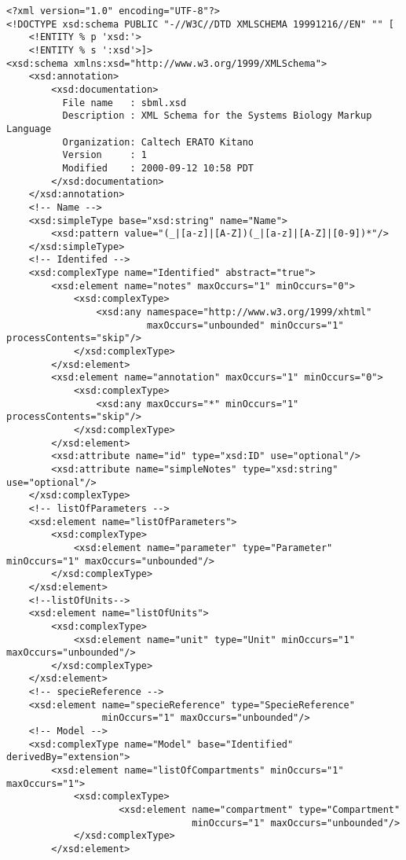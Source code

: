 \documentclass[10pt]{cek-article}
\begin{document}
\begin{small}
\tightspacing
\begin{verbatim}
<?xml version="1.0" encoding="UTF-8"?>
<!DOCTYPE xsd:schema PUBLIC "-//W3C//DTD XMLSCHEMA 19991216//EN" "" [
    <!ENTITY % p 'xsd:'>
    <!ENTITY % s ':xsd'>]>
<xsd:schema xmlns:xsd="http://www.w3.org/1999/XMLSchema">
    <xsd:annotation>
        <xsd:documentation>
          File name   : sbml.xsd
          Description : XML Schema for the Systems Biology Markup Language
          Organization: Caltech ERATO Kitano
          Version     : 1
          Modified    : 2000-09-12 10:58 PDT
        </xsd:documentation>
    </xsd:annotation>
    <!-- Name -->
    <xsd:simpleType base="xsd:string" name="Name">
        <xsd:pattern value="(_|[a-z]|[A-Z])(_|[a-z]|[A-Z]|[0-9])*"/>
    </xsd:simpleType>
    <!-- Identifed -->
    <xsd:complexType name="Identified" abstract="true">
        <xsd:element name="notes" maxOccurs="1" minOccurs="0">
            <xsd:complexType>
                <xsd:any namespace="http://www.w3.org/1999/xhtml"
                         maxOccurs="unbounded" minOccurs="1" processContents="skip"/>
            </xsd:complexType>
        </xsd:element>
        <xsd:element name="annotation" maxOccurs="1" minOccurs="0">
            <xsd:complexType>
                <xsd:any maxOccurs="*" minOccurs="1" processContents="skip"/>
            </xsd:complexType>
        </xsd:element>
        <xsd:attribute name="id" type="xsd:ID" use="optional"/>
        <xsd:attribute name="simpleNotes" type="xsd:string" use="optional"/>
    </xsd:complexType>
    <!-- listOfParameters -->
    <xsd:element name="listOfParameters">
        <xsd:complexType>
            <xsd:element name="parameter" type="Parameter" minOccurs="1" maxOccurs="unbounded"/>
        </xsd:complexType>
    </xsd:element>
    <!--listOfUnits-->
    <xsd:element name="listOfUnits">
        <xsd:complexType>
            <xsd:element name="unit" type="Unit" minOccurs="1" maxOccurs="unbounded"/>
        </xsd:complexType>
    </xsd:element>
    <!-- specieReference -->
    <xsd:element name="specieReference" type="SpecieReference"
                 minOccurs="1" maxOccurs="unbounded"/>
    <!-- Model -->
    <xsd:complexType name="Model" base="Identified" derivedBy="extension">
        <xsd:element name="listOfCompartments" minOccurs="1" maxOccurs="1">
            <xsd:complexType>
                    <xsd:element name="compartment" type="Compartment"
                                 minOccurs="1" maxOccurs="unbounded"/>
            </xsd:complexType>
        </xsd:element>

\end{verbatim}
\end{small}
\end{document}
